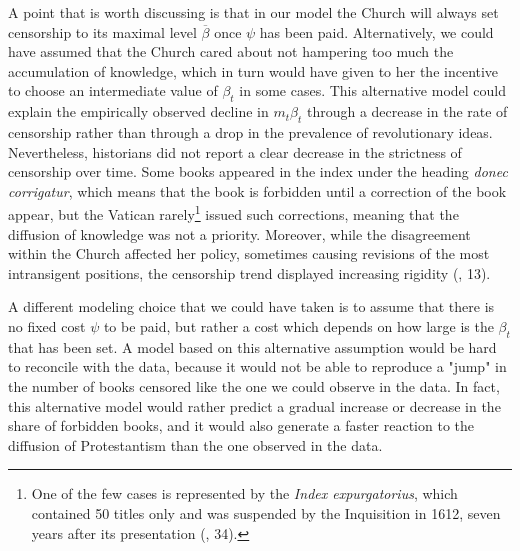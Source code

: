 \documentclass[12pt]{article}
\begin{document}
A point that is worth discussing is that in our model the Church will always set censorship to its maximal level $\overline{\beta}$ once $\psi$ has been paid. Alternatively, we could have assumed that the Church cared about not hampering too much the accumulation of knowledge, which in turn would have given to her the incentive to choose an intermediate value of $\beta_t$ in some cases. This alternative model could explain the empirically observed decline in $m_t \beta_t$ through a decrease in the rate of censorship rather than through a drop in the prevalence of revolutionary ideas. Nevertheless, historians did not report a clear decrease in the strictness of censorship over time. Some books appeared in the index under the heading \textit{donec corrigatur}, which means that the book is forbidden until a correction of the book appear, but the Vatican rarely\footnote{One of the few cases is represented by the \textit{Index expurgatorius}, which contained 50 titles only and was suspended by the Inquisition in 1612, seven years after its presentation (, 34).} issued such corrections, meaning that the diffusion of knowledge was not a priority. Moreover, while the disagreement within the Church affected her policy, sometimes causing revisions of the most intransigent positions, the censorship trend displayed increasing rigidity (, 13).

A different modeling choice that we could have taken is to assume that there is no fixed cost $\psi$ to be paid, but rather a cost which depends on how large is the $\beta_t$ that has been set. A model based on this alternative assumption would be hard to reconcile with the data, because it would not be able to reproduce a "jump" in the number of books censored like the one we could observe in the data. In fact, this alternative model would rather predict a gradual increase or decrease in the share of forbidden books, and it would also generate a faster reaction to the diffusion of Protestantism than the one observed in the data.
\end{document}
